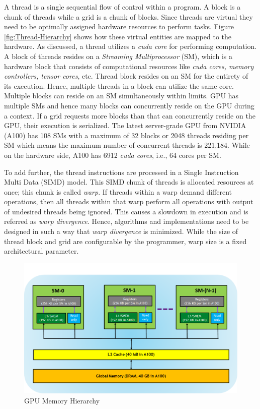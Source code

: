A thread is a single sequential flow of control within a program.
A block is a chunk of threads while a grid is a chunk of blocks.
Since threads are virtual they need to be optimally assigned hardware resources to perform tasks.
Figure \ref{fig:Thread-Hierarchy} shows how these virtual entities are mapped to the hardware.
As discussed, a thread utilizes a \textit{cuda core} for performing computation.
A block of threads resides on a \textit{Streaming Multiprocessor} (SM), which is a hardware block that consists of computational resources like \textit{cuda cores, memory controllers, tensor cores}, etc.
Thread block resides on an SM for the entirety of its execution.
Hence, multiple threads in a block can utilize the same core.
Multiple blocks can reside on an SM simultaneously within limits.
GPU has multiple SMs and hence many blocks can concurrently reside on the GPU during a context.
If a grid requests more blocks than that can concurrently reside on the GPU, their execution is serialized.
The latest server-grade GPU from NVIDIA (A100) has 108 SMs with a maximum of 32 blocks or 2048 threads residing per SM which means the maximum number of concurrent threads is  221,184.
While on the hardware side, A100 has 6912 \textit{cuda cores}, i.e., 64 cores per SM.

To add further, the thread instructions are processed in a Single Instruction Multi Data (SIMD) model. This SIMD chunk of threads is allocated resources at once; this chunk is called \textit{warp}. If threads within a warp demand different operations, then all threads within that warp perform all operations with output of undesired threads being ignored. This causes a slowdown in execution and is referred as \textit{warp divergence}. Hence, algorithms and implementations need to be designed in such a way that \textit{warp divergence} is minimized. While the size of thread block and grid are configurable by the programmer, warp size is a fixed architectural parameter.

\begin{figure}[h]
    \includegraphics[width=\textwidth]{fig/memory-hierarchy.png}
    \caption{GPU Memory Hierarchy}
    \label{fig:Memory-Hierarchy}
\end{figure}

